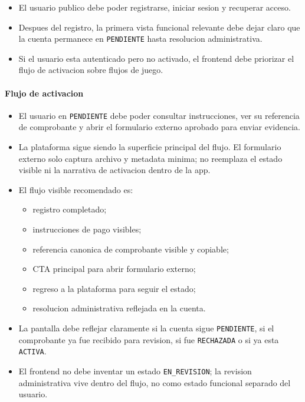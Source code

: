 \begin{itemize}
  \item El usuario publico debe poder registrarse, iniciar sesion y recuperar acceso.
  \item Despues del registro, la primera vista funcional relevante debe dejar claro que la cuenta permanece en \texttt{PENDIENTE} hasta resolucion administrativa.
  \item Si el usuario esta autenticado pero no activado, el frontend debe priorizar el flujo de activacion sobre flujos de juego.
\end{itemize}

\paragraph{Flujo de activacion}

\begin{itemize}
  \item El usuario en \texttt{PENDIENTE} debe poder consultar instrucciones, ver su referencia de comprobante y abrir el formulario externo aprobado para enviar evidencia.
  \item La plataforma sigue siendo la superficie principal del flujo. El formulario externo solo captura archivo y metadata minima; no reemplaza el estado visible ni la narrativa de activacion dentro de la app.
  \item El flujo visible recomendado es:
  \begin{itemize}
    \item registro completado;
    \item instrucciones de pago visibles;
    \item referencia canonica de comprobante visible y copiable;
    \item CTA principal para abrir formulario externo;
    \item regreso a la plataforma para seguir el estado;
    \item resolucion administrativa reflejada en la cuenta.
  \end{itemize}
  \item La pantalla debe reflejar claramente si la cuenta sigue \texttt{PENDIENTE}, si el comprobante ya fue recibido para revision, si fue \texttt{RECHAZADA} o si ya esta \texttt{ACTIVA}.
  \item El frontend no debe inventar un estado \texttt{EN\_REVISION}; la revision administrativa vive dentro del flujo, no como estado funcional separado del usuario.
\end{itemize}

